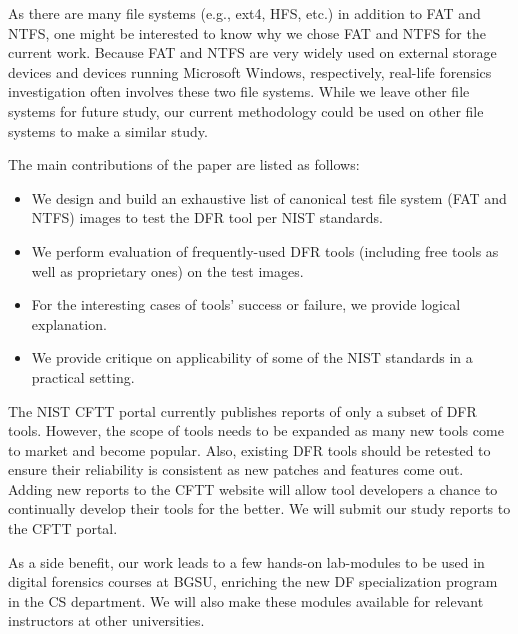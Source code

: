 As there are many file systems (e.g., ext4, HFS, etc.) in addition to FAT and NTFS, one might be interested to know why we chose FAT and NTFS for the current work. 
Because FAT and NTFS are very widely used on external storage devices and devices running Microsoft Windows, respectively,
real-life forensics investigation often involves these two file systems.
While we leave other file systems for future study, our current methodology could be 
used on other file systems to make a similar study.

The main contributions of the paper are listed as follows:
\begin{itemize}
\item We design and build an exhaustive list of canonical test file system (FAT and NTFS) images to test the DFR tool per NIST standards. 
\item We perform evaluation of frequently-used DFR tools (including free tools as well as proprietary ones) on the test images.
\item For the interesting cases of tools' success or failure, we provide logical explanation.
\item We provide critique on applicability of some of the NIST standards in a practical setting. 
\end{itemize}


The NIST CFTT portal currently publishes reports of only a subset of DFR tools. 
However, the scope of tools needs to be expanded as many new tools come to market and become popular.
Also, existing DFR tools should be retested to ensure their reliability is consistent 
as new patches and features come out. 
Adding new reports to the CFTT website will allow tool developers a 
chance to continually develop their tools for the better. We will submit our study reports to the CFTT portal.

As a side benefit, our work leads to a few hands-on lab-modules to be used in digital forensics courses 
at BGSU, enriching the new DF specialization program in the CS department. We will also make these modules
available for relevant instructors at other universities.
